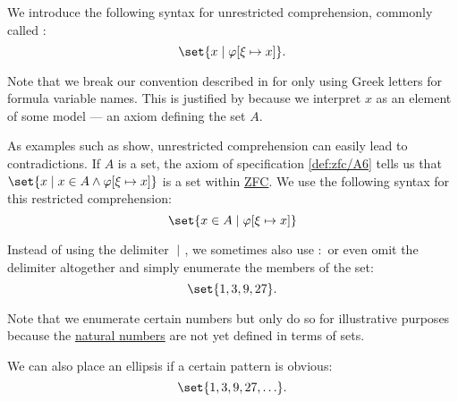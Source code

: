 \begin{definition}\label{def:set_builder_notation}
  We introduce the following syntax for unrestricted comprehension, commonly called :
  \begin{equation*}
    \set{ x \given \varphi[\xi \mapsto x] }.
  \end{equation*}

  Note that we break our convention described in  for only using Greek letters for formula variable names. This is justified by  because we interpret \( x \) as an element of some model --- an axiom defining the set \( A \).

  As examples such as  show, unrestricted comprehension can easily lead to contradictions. If \( A \) is a set, the axiom of specification \ref{def:zfc/A6} tells us that \( \set{ x \given x \in A \wedge \varphi[\xi \mapsto x] } \) is a set within \hyperref[def:zfc]{ZFC}. We use the following syntax for this restricted comprehension:
  \begin{equation*}
    \set{ x \in A \given \varphi[\xi \mapsto x] }
  \end{equation*}

  Instead of using the delimiter \( \given \), we sometimes also use \( : \) or even omit the delimiter altogether and simply enumerate the members of the set:
  \begin{equation*}
    \set{ 1, 3, 9, 27 }.
  \end{equation*}

  Note that we enumerate certain numbers but only do so for illustrative purposes because the \hyperref[def:set_of_natural_numbers]{natural numbers} are not yet defined in terms of sets.

  We can also place an ellipsis if a certain pattern is obvious:
  \begin{equation*}
    \set{ 1, 3, 9, 27, \ldots }.
  \end{equation*}
\end{definition}

